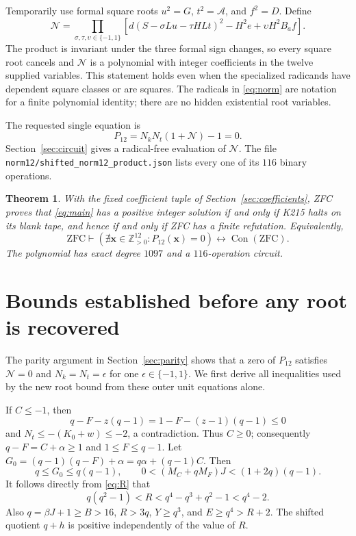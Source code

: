 \documentclass[11pt]{article}
\newtheorem{theorem}{Theorem}[section]
\theoremstyle{remark}\newtheorem{remark}[theorem]{Remark}
\newcommand{\Pos}{\mathbb Z_{>0}}\newcommand{\Con}{\operatorname{Con}}
\begin{document}
Temporarily use formal square roots $u^2=G$, $t^2=\mathcal A$, and
$f^2=D$. Define
\begin{equation}
 \mathcal N=
 \prod_{\sigma,\tau,\upsilon\in\{-1,1\}}
 \left[d(S-\sigma Lu-\tau HLt)^2-H^2e
              +\upsilon H^2B_af\right].\label{eq:norm}
\end{equation}
The product is invariant under the three formal sign changes, so every
square root cancels and $\mathcal N$ is a polynomial with integer
coefficients in the twelve supplied variables. This statement holds even
when the specialized radicands have dependent square classes or are squares.
The radicals in \eqref{eq:norm} are notation for a finite polynomial
identity; there are no hidden existential root variables.

The requested single equation is
\begin{equation}
 \boxed{\qquad P_{12}=N_kN_t(1+\mathcal N)-1=0.\qquad}
 \label{eq:main}
\end{equation}
Section~\ref{sec:circuit} gives a radical-free evaluation of
$\mathcal N$. The file \texttt{norm12/shifted\_norm12\_product.json}
lists every one of its $116$ binary operations.

\begin{theorem}\label{thm:main}
With the fixed coefficient tuple of Section~\ref{sec:coefficients}, ZFC
proves that \eqref{eq:main} has a positive integer solution if and only
if K215 halts on its blank tape, and hence if and only if ZFC has a finite
refutation. Equivalently,
\[
 \mathrm{ZFC}\vdash
 \left(\nexists\mathbf x\in\Pos^{12}:P_{12}(\mathbf x)=0\right)
 \longleftrightarrow\Con(\mathrm{ZFC}).
\]
The polynomial has exact degree $1097$ and a $116$-operation circuit.
\end{theorem}

\section{Bounds established before any root is recovered}
\label{sec:bootstrap}

The parity argument in Section~\ref{sec:parity} shows that a zero of
$P_{12}$ satisfies $\mathcal N=0$ and $N_k=N_t=\epsilon$ for one
$\epsilon\in\{-1,1\}$. We first derive all inequalities used by the
new root bound from these outer unit equations alone.

If $C\leq-1$, then
\[
 q-F-z(q-1)=1-F-(z-1)(q-1)\leq0
\]
and $N_t\leq-(K_0+w)\leq-2$, a contradiction. Thus $C\geq0$;
consequently $q-F=C+\alpha\geq1$ and $1\leq F\leq q-1$.
Let $G_0=(q-1)(q-F)+\alpha=q\alpha+(q-1)C$. Then
\[
 q\leq G_0\leq q(q-1),\qquad
 0<(M_C+qM_F)J<(1+2q)(q-1).
\]
It follows directly from \eqref{eq:R} that
\begin{equation}
 q(q^2-1)<R<q^4-q^3+q^2-1<q^4-2.\label{eq:Rbounds}
\end{equation}
Also $q=\beta J+1\geq B>16$, $R>3q$, $Y\geq q^3$, and
$E\geq q^4>R+2$. The shifted quotient $q+h$ is positive independently
of the value of $R$.
\end{document}
